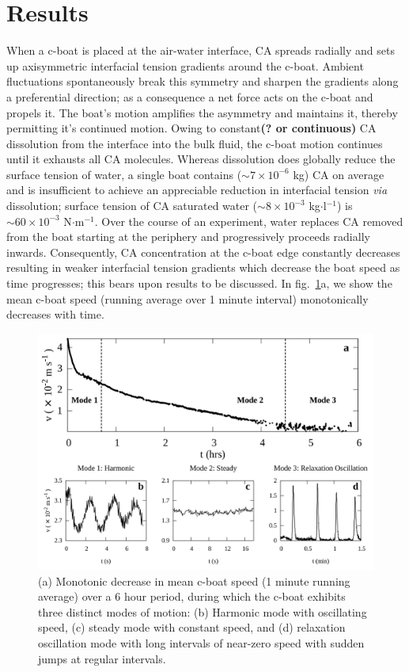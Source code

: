 \documentclass[journal=langd5, manuscript=article, layout=twocolumn]{achemso}
\begin{document}
\section{Results}
\label{resultsec}
When a c-boat is placed at the air-water interface, CA spreads radially and sets up axisymmetric interfacial tension gradients around the c-boat. Ambient fluctuations spontaneously break this symmetry and sharpen the gradients along a preferential direction; as a consequence a net force acts on the c-boat and propels it. The boat's motion amplifies the asymmetry and maintains it, thereby permitting it's continued motion. Owing to constant{\bf(? or continuous)} CA dissolution from the interface into the bulk fluid, the c-boat motion continues until it exhausts all CA molecules. Whereas dissolution does globally reduce the surface tension of water, a single boat contains  ($\sim 7 \times 10^{-6}$ kg) CA on average and is insufficient to achieve an appreciable reduction in interfacial tension {\it via} dissolution; surface tension of CA saturated water ($\sim 8 \times 10^{-3}$ kg$\cdot$l$^{-1}$) is $\sim 60\times 10^{-3}$ N$\cdot$m$^{-1}$. Over the course of an experiment, water replaces CA removed from the boat starting at the periphery and progressively proceeds radially inwards. Consequently, CA concentration at the c-boat edge constantly decreases resulting in weaker interfacial tension gradients which decrease the boat speed as time progresses; this bears upon results to be discussed. In fig.~\ref{fig2}a, we show the mean c-boat speed (running average over 1 minute interval) monotonically decreases with time.


\begin{figure}[ht]
\centering
\includegraphics[width=0.85\linewidth]{figure2_v2.pdf}
\caption{(a) Monotonic decrease in mean c-boat speed (1 minute running average) over a 6 hour period, during which the c-boat exhibits three distinct modes of motion: (b) Harmonic mode with oscillating speed, (c) steady mode with constant speed, and (d) relaxation oscillation mode with long intervals of near-zero speed with sudden jumps at regular intervals.}
\label{fig2}
\end{figure}
\end{document}
